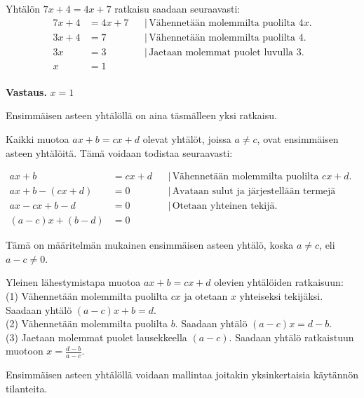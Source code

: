 \begin{esimerkki}
Yhtälön $7x+4=4x+7$ ratkaisu saadaan seuraavasti:
\begin{align*}
7x+4 &= 4x+7 & &| \, \text{Vähennetään molemmilta puolilta $4x$.} \\
3x+4 &= 7 & &| \, \text{Vähennetään molemmilta puolilta 4.} \\
3x &= 3 & &| \, \text{Jaetaan molemmat puolet luvulla 3.} \\
x &= 1 & & \\
\end{align*}

\textbf{Vastaus.} $x=1$
\end{esimerkki}

Ensimmäisen asteen yhtälöllä on aina täsmälleen yksi ratkaisu.

Kaikki muotoa $ax+b=cx+d$ olevat yhtälöt, joissa $a \neq c$, ovat ensimmäisen asteen yhtälöitä. Tämä voidaan todistaa seuraavasti:

\begin{align*}
ax+b &= cx+d & &| \, \text{Vähennetään molemmilta puolilta $cx+d$}. \\
ax+b - (cx+d) &= 0 & &| \, \text{Avataan sulut ja järjestellään termejä uudelleen.} \\
ax - cx + b - d &= 0 & &| \, \text{Otetaan yhteinen tekijä.} \\
(a-c)x + (b-d) &= 0 & &
\end{align*}

Tämä on määritelmän mukainen ensimmäisen asteen yhtälö, koska $a \neq c$, eli $a-c \neq 0$.

\begin{esimerkki}
Yleinen lähestymistapa muotoa $ax+b = cx+d$ olevien yhtälöiden ratkaisuun: \\
(1) Vähennetään molemmilta puolilta $cx$ ja otetaan $x$ yhteiseksi tekijäksi. Saadaan yhtälö $(a-c)x + b = d$. \\
(2) Vähennetään molemmilta puolilta $b$. Saadaan yhtälö $(a-c)x = d-b$. \\
(3) Jaetaan molemmat puolet lausekkeella $(a-c)$. Saadaan yhtälö ratkaistuun muotoon $x = \frac{d-b}{a-c}$. 
\end{esimerkki}

Ensimmäisen asteen yhtälöllä voidaan mallintaa joitakin yksinkertaisia käytännön tilanteita. 

